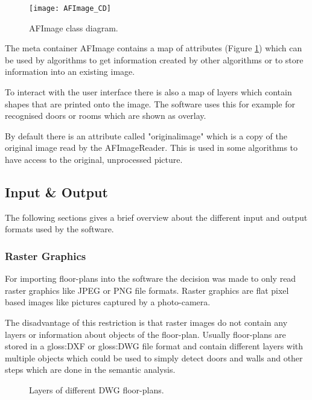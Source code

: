 \begin{figure}[h]
  \centering
      \texttt{[image: AFImage\_CD]}
  \caption{AFImage class diagram.}
  \label{fig:AFImage_CD}
\end{figure}

The meta container AFImage contains a map of attributes (Figure \ref{fig:AFImage_CD}) which can be used by algorithms to get information created by other algorithms or to store information into an existing image.

To interact with the user interface there is also a map of layers which contain shapes that are printed onto the image. The software uses this for example for recognised doors or rooms which are shown as overlay.

By default there is an attribute called "originalimage" which is a copy of the original image read by the AFImageReader. This is used in some algorithms to have access to the original, unprocessed picture.

\pagebreak

\subsection{Input \& Output}
\label{sub:ImportExport}
The following sections gives a brief overview about the different input and output formats used by the software.

\subsubsection{Raster Graphics}
For importing floor-plans into the software the decision was made to only read raster graphics like JPEG or PNG file formats. Raster graphics are flat pixel based images like pictures captured by a photo-camera.

The disadvantage of this restriction is that raster images do not contain any layers or information about objects of the floor-plan. Usually floor-plans are stored in a \gls{gloss:DXF} or \gls{gloss:DWG} file format and contain different layers with multiple objects which could be used to simply detect doors and walls and other steps which are done in the semantic analysis.

\begin{figure}[h]
	\centering
	\hfill
	\hfill
	\caption{Layers of different DWG floor-plans. }
	\label{fig:layer_comparison}
\end{figure}

